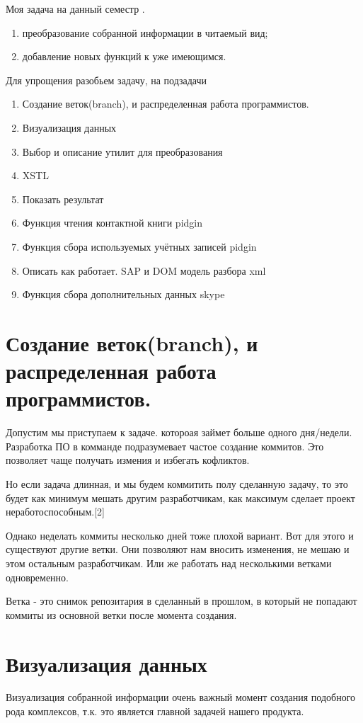 \newpage
Моя задача на данный семестр . \\
\begin{enumerate}
\item преобразование собранной информации в читаемый вид;
\item добавление новых функций к уже имеющимся.
\end{enumerate}
Для упрощения разобьем задачу, на подзадачи
\begin{enumerate}
\item Создание веток(branch), и распределенная работа программистов. 
\item Визуализация данных
\item Выбор и описание утилит для преобразования
\item XSTL
\item Показать результат
\item Функция чтения контактной книги pidgin
\item Функция сбора используемых учётных записей pidgin
\item Описать как работает. SAP и DOM модель разбора xml
\item Функция сбора дополнительных данных skype
\end{enumerate}
\chapter*{Создание веток(branch), и распределенная работа программистов.}
Допустим мы приступаем к задаче. котороая займет больше одного дня/недели. Разработка ПО в комманде подразумевает частое создание коммитов. Это позволяет чаще получать измения и избегать кофликтов. 

Но если задача длинная, и мы будем коммитить полу сделанную задачу, то это будет как минимум мешать другим разработчикам, как максимум сделает проект неработоспособным.[2]

Однако неделать коммиты несколько дней тоже плохой вариант. Вот для этого и существуют другие ветки. Они позволяют нам вносить изменения, не мешаю и этом остальным разработчикам. Или же работать над несколькими ветками одновременно.

Ветка - это снимок репозитария в сделанный в прошлом, в который не попадают коммиты из основной ветки после момента создания.

\chapter*{Визуализация данных}
Визуализация собранной информации очень важный момент создания подобного рода комплексов, т.к. это является главной задачей нашего продукта. 

